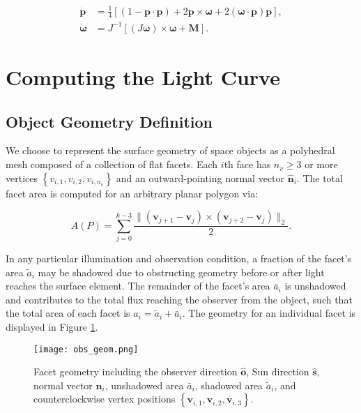 \documentclass[a4paper,twocolumn]{spaceDebrisC} %
\newcommand{\vctr}[1]{\bm{#1}}
\newcommand{\unitv}[1]{\hat{\vctr{#1}}}
\newcommand{\figmed}[0]{0.4\textwidth}
\begin{document}
\begin{align}
 \vctr{\dot{p}} &= \frac{1}{4} \left[ \left(1 - \vctr{p} \cdot \vctr{p}\right) + 2\vctr{p} \times \vctr{\omega} + 2 \left(\vctr{\omega} \cdot \vctr{p} \right)\vctr{p} \right], \label{eq:mrp_kde} \\
 \vctr{\dot{\omega}} &= J^{-1} \left[ \left(J \vctr{\omega}\right) \times \vctr{\omega} + \vctr{M}\right]. \label{eq:rbtf_dynamics}
\end{align}

\FloatBarrier
\section{Computing the Light Curve}

\subsection{Object Geometry Definition}

We choose to represent the surface geometry of space objects as a polyhedral mesh composed of a collection of flat facets. Each $i$th face has $n_v \geq 3$ or more vertices $\left\{ v_{i,1}, v_{i,2}, v_{i,n_v} \right\}$ and an outward-pointing normal vector $\unitv{n}_i$. The total facet area is computed for an arbitrary planar polygon via:

\begin{equation} \label{eq:poly_area}
 A(P) = \sum_{j=0}^{k-3} \frac{\| \left( \vctr{v}_{j+1} - \vctr{v}_{j} \right) \times \left( \vctr{v}_{j+2} - \vctr{v}_{j} \right)\|_2}{2}.
 \end{equation} 
 
 In any particular illumination and observation condition, a fraction of the facet's area $\tilde{a}_i$ may be shadowed due to obstructing geometry before or after light reaches the surface element. The remainder of the facet's area $\bar{a}_i$ is unshadowed and contributes to the total flux reaching the observer from the object, such that the total area of each facet is $a_i = \tilde{a}_i + \bar{a}_i$. The geometry for an individual facet is displayed in Figure \ref{fig:facet_geom}.

\begin{figure}[ht]
  \centering
  \texttt{[image: obs\_geom.png]}
  \caption{Facet geometry including the observer direction $\unitv{o}$, Sun direction $\unitv{s}$, normal vector $\unitv{n}_i$, unshadowed area $\bar{a}_i$, shadowed area $\tilde{a}_i$, and counterclockwise vertex positions $\left\{ \vctr{v}_{i,1}, \vctr{v}_{i,2}, \vctr{v}_{i,3} \right\}$.}
  \label{fig:facet_geom}
\end{figure}
\end{document}
